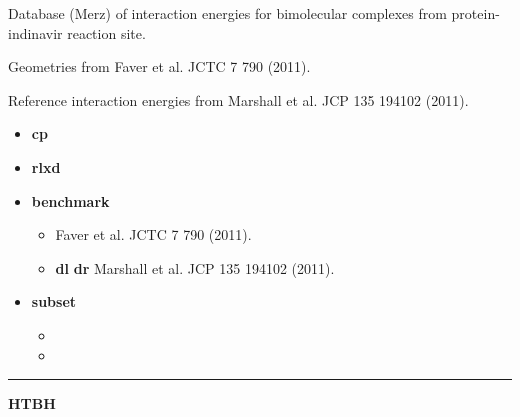 \documentclass[letterpaper,10pt,english]{sphinxmanual}
\begin{document}
\begin{DUlineblock}{0em}
\item[] Database (Merz) of interaction energies for bimolecular complexes from protein-indinavir reaction site.
\item[] Geometries from Faver et al. JCTC 7 790 (2011).
\item[] Reference interaction energies from Marshall et al. JCP 135 194102 (2011).
\end{DUlineblock}
\begin{itemize}
\item {} 
\textbf{cp}   \textbar{}\textbar{} 

\item {} 
\textbf{rlxd} 

\item {} 
\textbf{benchmark}
\begin{itemize}
\item {} 
 Faver et al. JCTC 7 790 (2011).

\item {} 
{\color{red}\bfseries{}\textbar{}dl\textbar{}}  {\color{red}\bfseries{}\textbar{}dr\textbar{}} Marshall et al. JCP 135 194102 (2011).

\end{itemize}

\item {} 
\textbf{subset}
\begin{itemize}
\item {} 

\item {} 

\end{itemize}

\end{itemize}


\bigskip\hrule{}\bigskip

\label{db:module-HTBH}
\textbf{HTBH}
\end{document}
